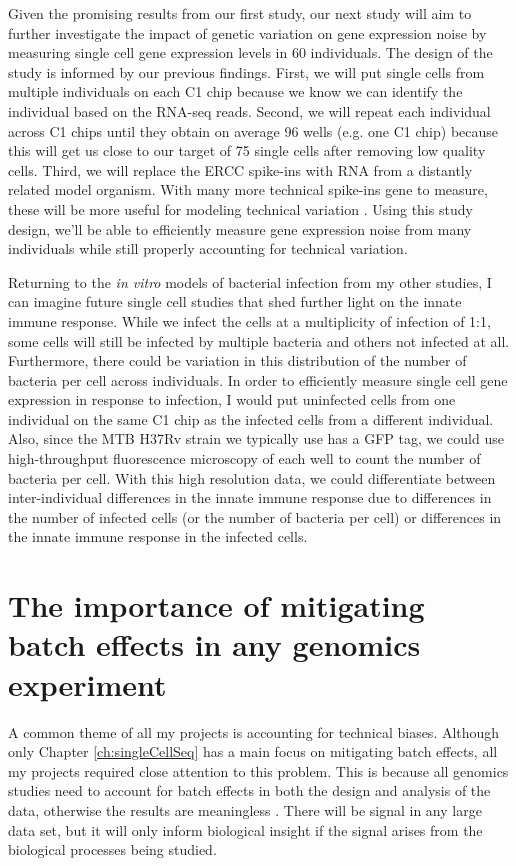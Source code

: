 Given the promising results from our first study, our next study will
aim to further investigate the impact of genetic variation on gene
expression noise by measuring single cell gene expression levels in 60
individuals. The design of the study is informed by our previous
findings. First, we will put single cells from multiple individuals on
each C1 chip because we know we can identify the individual based on
the RNA-seq reads. Second, we will repeat each individual across C1
chips until they obtain on average 96 wells (e.g. one C1 chip) because
this will get us close to our target of 75 single cells after removing
low quality cells. Third, we will replace the ERCC spike-ins with RNA
from a distantly related model organism. With many more technical
spike-ins gene to measure, these will be more useful for modeling
technical variation \citep{Risso2014}. Using this study design, we'll
be able to efficiently measure gene expression noise from many
individuals while still properly accounting for technical variation.

Returning to the \emph{in vitro} models of bacterial infection from my
other studies, I can imagine future single cell studies that shed
further light on the innate immune response. While we infect the cells
at a multiplicity of infection of 1:1, some cells will still be
infected by multiple bacteria and others not infected at
all. Furthermore, there could be variation in this distribution of the
number of bacteria per cell across individuals. In order to
efficiently measure single cell gene expression in response to
infection, I would put uninfected cells from one individual on the
same C1 chip as the infected cells from a different individual. Also,
since the MTB H37Rv strain we typically use has a GFP tag, we could
use high-throughput fluorescence microscopy of each well to count the
number of bacteria per cell. With this high resolution data, we could
differentiate between inter-individual differences in the innate
immune response due to differences in the number of infected cells (or
the number of bacteria per cell) or differences in the innate immune
response in the infected cells.

\section{The importance of mitigating batch effects in any genomics experiment}

A common theme of all my projects is accounting for technical
biases. Although only Chapter \ref{ch:singleCellSeq} has a main focus
on mitigating batch effects, all my projects required close attention
to this problem. This is because all genomics studies need to account
for batch effects in both the design and analysis of the data,
otherwise the results are meaningless \citep{Auer2010, Leek2010,
  Gilad2015}. There will be signal in any large data set, but it will
only inform biological insight if the signal arises from the
biological processes being studied.

